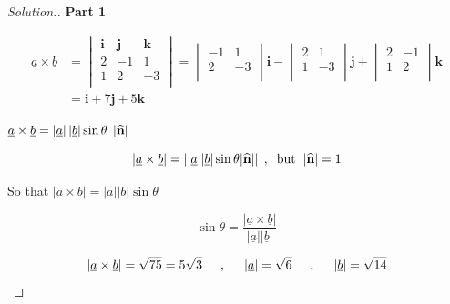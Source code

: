 \documentclass[11pt,a4paper]{article}
\theoremstyle{definition}
\newenvironment{solution}
  {\renewcommand{\qedsymbol}{}\begin{proof}[\textit{Solution}.]}
  {\end{proof}}
\newcommand{\subhead}[1]{%
  \par\medskip\noindent\textbf{#1}\par\nobreak\smallskip}
\begin{document}
\begin{solution}
\subhead{Part 1}
\begin{align*}
\underline{a} \times \underline{b} & = 
\begin{vmatrix}
\textbf{i} & \textbf{j} & \textbf{k}\\
2 & -1 & 1\\
1 & 2 & -3\\
\end{vmatrix}
 = \begin{vmatrix}
-1 & 1\\
2 & -3\\
\end{vmatrix}\textbf{i} - \begin{vmatrix}
2 & 1\\
1 & -3\\
\end{vmatrix}\textbf{j} + \begin{vmatrix}
2 & -1\\
1 & 2\\
\end{vmatrix}\textbf{k}\\
& = \textbf{i} + 7\textbf{j} + 5\textbf{k}
\end{align*}

$\displaystyle{ \underline{a} \times \underline{b} = \left|\underline{a}\right|\left|\underline{b}\right| \sin \theta \hspace{0.1cm} \left|\widehat{\textbf{n}}\right|}$

$$\left|\underline{a}\times \underline{b}\right| = \left||\underline{a}||\underline{b}|\sin \theta |\widehat{\textbf{n}}|\right|\hspace{0.1cm}, \hspace{0.2cm}\text{but}\hspace{0.2cm} |\widehat{\textbf{n}}| = 1$$

So that $\left|\underline{a}\times \underline{b}\right|= \left|\underline{a}\right|\left|b\right|\sin \theta$

$$\sin \theta = \frac{\left|\underline{a} \times \underline{b}\right|
}{\left|\underline{a}\right|\left|\underline{b}\right|
}$$

$$\left|\underline{a}\times \underline{b}\right|=\sqrt{75} = 5\sqrt{3}\hspace{0.5cm},\hspace{0.5cm}
 \left|\underline{a}\right|=\sqrt{6}\hspace{0.5cm},\hspace{0.5cm} \left|\underline{b}\right|=\sqrt{14}$$


\end{solution}
\end{document}
